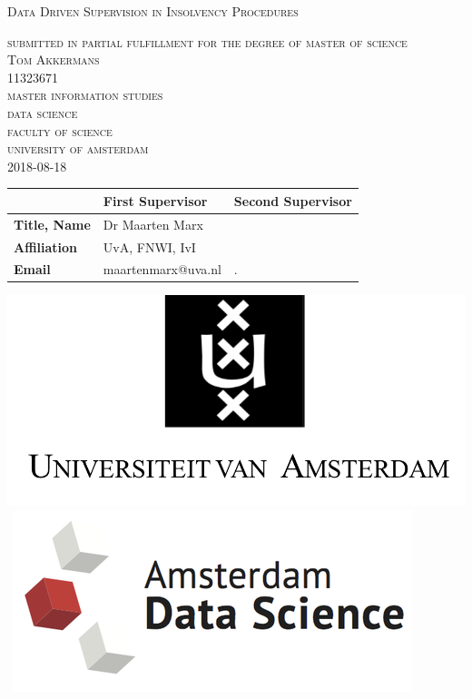 \begin{titlepage}
\begin{center}

\textsc{\Large Data Driven Supervision in Insolvency Procedures }

\bigskip

\textsc{\large
submitted in partial fulfillment for the degree of master of science\\
%
\bigskip
Tom Akkermans\\
%
11323671\\
%
\bigskip
master information studies\\
%
data science \\
%
faculty of science\\
%
university of amsterdam\\
%
\bigskip
2018-08-18
}

\end{center}
 

\vfill

\begin{center}
\begin{tabular}{|l||ll|}
\hline
 & \textbf{First Supervisor} & \textbf{Second Supervisor}  \\   
 \hline
\textbf{Title, Name} & Dr Maarten Marx&  \\
\textbf{Affiliation} &UvA, FNWI, IvI & \\ 
\textbf{Email} & maartenmarx@uva.nl& . \\
\hline
\end{tabular}
\end{center}

\bigskip

\begin{center}
\mbox{\includegraphics[width=.2\paperwidth]{logo-uva.png} 
\includegraphics[width=.2\paperwidth]{ads.png}
}
\end{center}
\end{titlepage}

%
%
%
